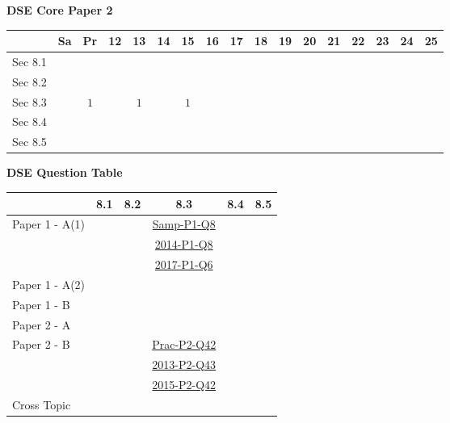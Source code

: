\documentclass[12pt, a4paper]{article}
\begin{document}
\begin{absolutelynopagebreak}
\begin{center}
\textbf{DSE Core Paper 2}
\end{center}
\begin{center}
\begin{tabular}{|l|c|c|c|c|c|c|c|c|c|c|c|c|c|c|c|c|}
\hline
        & Sa & Pr & 12 & 13 & 14 & 15 & 16 & 17 & 18 & 19 & 20 & 21 & 22 & 23 & 24 & 25 \\\hline\hline
Sec 8.1 &  &  &  &  &  &  &  &  &  &  &  &  &  &  &  &  \\\hline
Sec 8.2 &  &  &  &  &  &  &  &  &  &  &  &  &  &  &  &  \\\hline
Sec 8.3 &  &  $1$ &  &  $1$ &  &  $1$ &  &  &  &  &  &  &  &  &  &  \\\hline
Sec 8.4 &  &  &  &  &  &  &  &  &  &  &  &  &  &  &  &  \\\hline
Sec 8.5 &  &  &  &  &  &  &  &  &  &  &  &  &  &  &  &  \\\hline
\end{tabular}
\end{center}
\end{absolutelynopagebreak}
\begin{absolutelynopagebreak}
\begin{center}
\textbf{DSE Question Table}
\end{center}
\begin{center}
\begin{tabular}{|l|c|c|c|c|c|}
\hline
        & 8.1 & 8.2 & 8.3 & 8.4 & 8.5 \\\hline
\hline
Paper 1 - A(1)&  &  & \hyperref[DSE2012S-CoreP1-Q08]{Samp-P1-Q8} &  &  \\
&  &  & \hyperref[DSE2014-CoreP1-Q08]{2014-P1-Q8} &  &  \\
&  &  & \hyperref[DSE2017-CoreP1-Q06]{2017-P1-Q6} &  &  \\
\hline
Paper 1 - A(2)&  &  &  &  &  \\
\hline
Paper 1 - B&  &  &  &  &  \\
\hline
\hline
Paper 2 - A&  &  &  &  &  \\
\hline
Paper 2 - B&  &  & \hyperref[DSE2012P-CoreP2-Q42]{Prac-P2-Q42} &  &  \\
&  &  & \hyperref[DSE2013-CoreP2-Q43]{2013-P2-Q43} &  &  \\
&  &  & \hyperref[DSE2015-CoreP2-Q42]{2015-P2-Q42} &  &  \\
\hline
\hline
Cross Topic&  &  &  &  &  \\
\hline
\end{tabular}
\end{center}
\end{absolutelynopagebreak}
\end{document}
